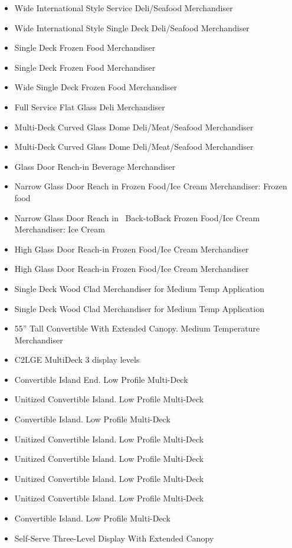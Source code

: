 \begin{itemize}
\item
  Wide International Style Service Deli/Seafood Merchandiser
\item
  Wide International Style Single Deck Deli/Seafood Merchandiser
\item
  Single Deck Frozen Food Merchandiser
\item
  Single Deck Frozen Food Merchandiser
\item
  Wide Single Deck Frozen Food Merchandiser
\item
  Full Service Flat Glass Deli Merchandiser
\item
  Multi-Deck Curved Glass Dome Deli/Meat/Seafood Merchandiser
\item
  Multi-Deck Curved Glass Dome Deli/Meat/Seafood Merchandiser
\item
  Glass Door Reach-in Beverage Merchandiser
\item
  Narrow Glass Door Reach in Frozen Food/Ice Cream Merchandiser: Frozen food
\item
  Narrow Glass Door Reach in~ Back-toBack Frozen Food/Ice Cream Merchandiser: Ice Cream
\item
  High Glass Door Reach-in Frozen Food/Ice Cream Merchandiser
\item
  High Glass Door Reach-in Frozen Food/Ice Cream Merchandiser
\item
  Single Deck Wood Clad Merchandiser for Medium Temp Application
\item
  Single Deck Wood Clad Merchandiser for Medium Temp Application
\item
  55'' Tall Convertible With Extended Canopy. Medium Temperature Merchandiser
\item
  C2LGE MultiDeck 3 display levels
\item
  Convertible Island End. Low Profile Multi-Deck
\item
  Unitized Convertible Island. Low Profile Multi-Deck
\item
  Convertible Island. Low Profile Multi-Deck
\item
  Unitized Convertible Island. Low Profile Multi-Deck
\item
  Unitized Convertible Island. Low Profile Multi-Deck
\item
  Unitized Convertible Island. Low Profile Multi-Deck
\item
  Unitized Convertible Island. Low Profile Multi-Deck
\item
  Convertible Island. Low Profile Multi-Deck
\item
  Self-Serve Three-Level Display With Extended Canopy

\end{itemize}
